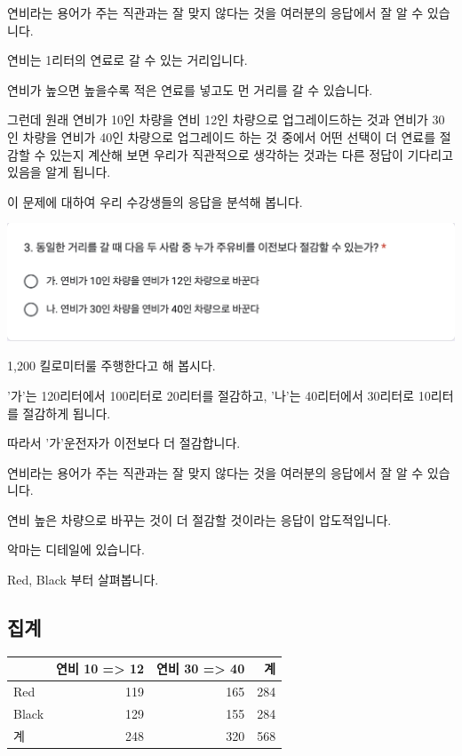 \documentclass[
]{book}
\begin{document}
연비라는 용어가 주는 직관과는 잘 맞지 않다는 것을 여러분의 응답에서 잘 알 수 있습니다.

연비는 1리터의 연료로 갈 수 있는 거리입니다.

연비가 높으면 높을수록 적은 연료를 넣고도 먼 거리를 갈 수 있습니다.

그런데 원래 연비가 10인 차량을 연비 12인 차량으로 업그레이드하는 것과 연비가 30인 차량을 연비가 40인 차량으로 업그레이드 하는 것 중에서 어떤 선택이 더 연료를 절감할 수 있는지 계산해 보면 우리가 직관적으로 생각하는 것과는 다른 정답이 기다리고 있음을 알게 됩니다.

이 문제에 대하여 우리 수강생들의 응답을 분석해 봅니다.

\includegraphics[width=0.75\linewidth]{./pics/Quiz240524_Q3}

1,200 킬로미터룰 주행한다고 해 봅시다.

'가'는 120리터에서 100리터로 20리터를 절감하고, '나'는 40리터에서 30리터로 10리터를 절감하게 됩니다.

따라서 '가'운전자가 이전보다 더 절감합니다.

연비라는 용어가 주는 직관과는 잘 맞지 않다는 것을 여러분의 응답에서 잘 알 수 있습니다.

연비 높은 차량으로 바꾸는 것이 더 절감할 것이라는 응답이 압도적입니다.

악마는 디테일에 있습니다.

Red, Black 부터 살펴봅니다.

\subsection{집계}\label{uxc9d1uxacc4-62}

\begin{tabular}{l|r|r|r}
\hline
  & 연비 10 => 12 & 연비 30 => 40 & 계\\
\hline
Red & 119 & 165 & 284\\
\hline
Black & 129 & 155 & 284\\
\hline
계 & 248 & 320 & 568\\
\hline
\end{tabular}
\end{document}
